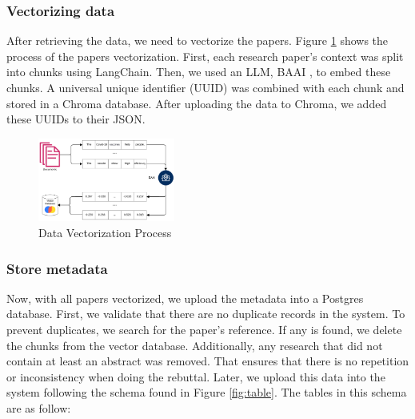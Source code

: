 \subsubsection{Vectorizing data}
After retrieving the data, we need to vectorize the papers. Figure \ref{fig:vector} shows the process of the papers vectorization. First, each research paper’s context was split into chunks using LangChain. Then, we used an LLM, BAAI \cite{bge_embedding}, to embed these chunks. A universal unique identifier (UUID) was combined with each chunk and stored in a Chroma \cite{chroma} database. After uploading the data to Chroma, we added these UUIDs to their JSON. 

\begin{figure}[h]
	\begin{center}
		\includegraphics[width=0.4\textwidth]{figures/Data_vectorization.png} %
	\end{center}
	\caption{Data Vectorization Process} %
	\label{fig:vector}
\end{figure}


\subsubsection{Store metadata}
Now, with all papers vectorized, we upload the metadata into a Postgres database. First, we validate that there are no duplicate records in the system. To prevent duplicates, we search for the paper's reference. If any is found, we delete the chunks from the vector database. Additionally, any research that did not contain at least an abstract was removed. That ensures that there is no repetition or inconsistency when doing the rebuttal. Later, we upload this data into the system following the schema found in Figure \ref{fig:table}. The tables in this schema are as follow:

